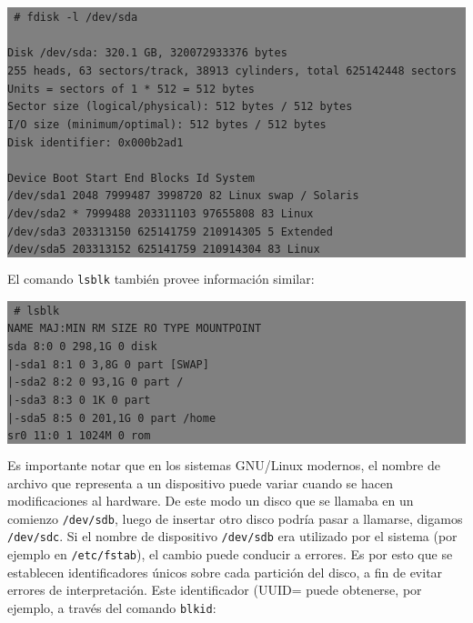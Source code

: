 \documentclass[12pt]{article}
\begin{document}
\colorbox{grey}{\parbox[t]{0.95\linewidth}{ \vspace*{0.5cm} { 
{\tt
\# fdisk -l /dev/sda\\
\\
Disk /dev/sda: 320.1 GB, 320072933376 bytes\\
255 heads, 63 sectors/track, 38913 cylinders, total 625142448 sectors\\
Units = sectors of 1 * 512 = 512 bytes\\
Sector size (logical/physical): 512 bytes / 512 bytes\\
I/O size (minimum/optimal): 512 bytes / 512 bytes\\
Disk identifier: 0x000b2ad1\\
\\
   Device Boot      Start         End      Blocks   Id  System\\
/dev/sda1            2048     7999487     3998720   82  Linux swap / Solaris\\
/dev/sda2   *     7999488   203311103    97655808   83  Linux\\
/dev/sda3       203313150   625141759   210914305    5  Extended\\
/dev/sda5       203313152   625141759   210914304   83  Linux\\
}
} \vspace*{0.5cm} } } 

El comando \texttt{lsblk} también provee información similar: 

\colorbox{grey}{\parbox[t]{0.95\linewidth}{ \vspace*{0.5cm} { 
{\tt
\# lsblk \\
NAME   MAJ:MIN RM   SIZE RO TYPE MOUNTPOINT\\
sda      8:0    0 298,1G  0 disk \\
|-sda1   8:1    0   3,8G  0 part [SWAP]\\
|-sda2   8:2    0  93,1G  0 part /\\
|-sda3   8:3    0     1K  0 part \\
|-sda5   8:5    0 201,1G  0 part /home\\
sr0     11:0    1  1024M  0 rom  \\
}
} \vspace*{0.5cm} } } 

Es importante notar que en los sistemas GNU/Linux modernos, el nombre de 
archivo que representa a un dispositivo puede variar cuando se hacen 
modificaciones al hardware. De este modo un disco que se llamaba en un 
comienzo \texttt{/dev/sdb}, luego de insertar otro disco podría pasar a llamarse,
digamos \texttt{/dev/sdc}. Si el nombre de dispositivo \texttt{/dev/sdb}
era utilizado por el sistema (por ejemplo en \texttt{/etc/fstab}), el cambio puede 
conducir a errores. Es por esto que se establecen identificadores
únicos sobre cada partición del disco, a fin de evitar errores de 
interpretación. Este identificador (UUID= puede obtenerse, por ejemplo,
a través del comando \texttt{blkid}:  
\end{document}
